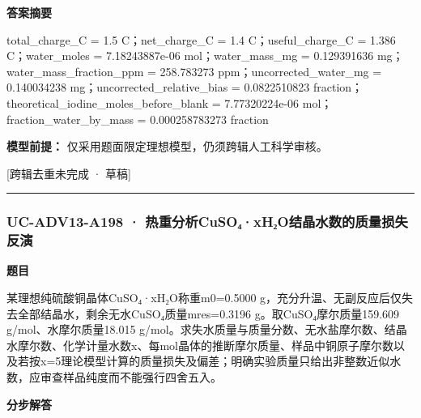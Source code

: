 \documentclass[UTF8,11pt,a4paper]{ctexart}
\begin{document}
\noindent\textbf{答案摘要}\par
total\_charge\_C = 1.5 C；net\_charge\_C = 1.4 C；useful\_charge\_C = 1.386 C；water\_moles = 7.18243887e-06 mol；water\_mass\_mg = 0.129391636 mg；water\_mass\_fraction\_ppm = 258.783273 ppm；uncorrected\_water\_mg = 0.140034238 mg；uncorrected\_relative\_bias = 0.0822510823 fraction；theoretical\_iodine\_moles\_before\_blank = 7.77320224e-06 mol；fraction\_water\_by\_mass = 0.000258783273 fraction\par
\noindent\textbf{模型前提：}
仅采用题面限定理想模型，仍须跨辑人工科学审核。\par
\noindent\textcolor{red!65!black}{[跨辑去重未完成 · 草稿]} \par
\medskip\hrule\medskip
{}
\subsubsection*{UC-ADV13-A198 · 热重分析CuSO₄·xH₂O结晶水数的质量损失反演}
\noindent\textbf{题目}\par
某理想纯硫酸铜晶体CuSO₄·xH₂O称重m0=0.5000 g，充分升温、无副反应后仅失去全部结晶水，剩余无水CuSO₄质量mres=0.3196 g。取CuSO₄摩尔质量159.609 g/mol、水摩尔质量18.015 g/mol。求失水质量与质量分数、无水盐摩尔数、结晶水摩尔数、化学计量水数x、每mol晶体的推断摩尔质量、样品中铜原子摩尔数以及若按x=5理论模型计算的质量损失及偏差；明确实验质量只给出非整数近似水数，应审查样品纯度而不能强行四舍五入。\par
\medskip\noindent\textbf{分步解答}
\end{document}

